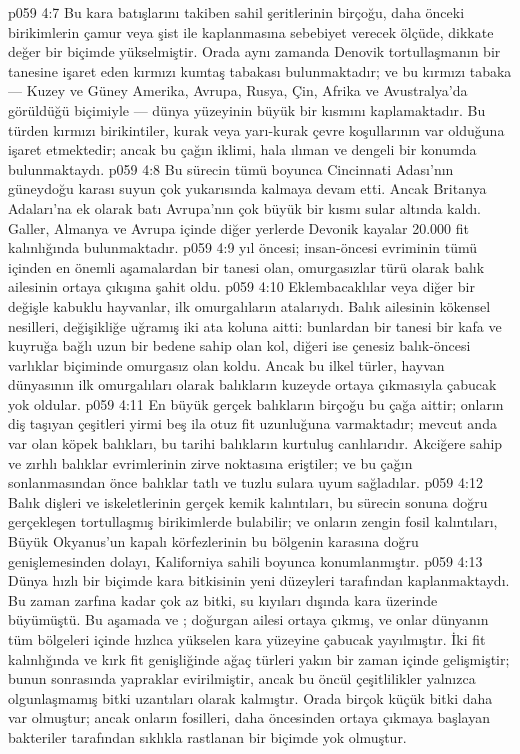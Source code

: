 \vs p059 4:7 Bu kara batışlarını takiben sahil şeritlerinin birçoğu, daha önceki birikimlerin çamur veya şist ile kaplanmasına sebebiyet verecek ölçüde, dikkate değer bir biçimde yükselmiştir. Orada aynı zamanda Denovik tortullaşmanın bir tanesine işaret eden kırmızı kumtaş tabakası bulunmaktadır; ve bu kırmızı tabaka --- Kuzey ve Güney Amerika, Avrupa, Rusya, Çin, Afrika ve Avustralya’da görüldüğü biçimiyle --- dünya yüzeyinin büyük bir kısmını kaplamaktadır. Bu türden kırmızı birikintiler, kurak veya yarı\hyp{}kurak çevre koşullarının var olduğuna işaret etmektedir; ancak bu çağın iklimi, hala ılıman ve dengeli bir konumda bulunmaktaydı.
\vs p059 4:8 Bu sürecin tümü boyunca Cincinnati Adası’nın güneydoğu karası suyun çok yukarısında kalmaya devam etti. Ancak Britanya Adaları’na ek olarak batı Avrupa’nın çok büyük bir kısmı sular altında kaldı. Galler, Almanya ve Avrupa içinde diğer yerlerde Devonik kayalar 20.000 fit kalınlığında bulunmaktadır.
\vs p059 4:9  yıl öncesi; insan\hyp{}öncesi evriminin tümü içinden en önemli aşamalardan bir tanesi olan, omurgasızlar türü olarak balık ailesinin ortaya çıkışına şahit oldu.
\vs p059 4:10 Eklembacaklılar veya diğer bir değişle kabuklu hayvanlar, ilk omurgalıların atalarıydı. Balık ailesinin kökensel nesilleri, değişikliğe uğramış iki ata koluna aitti: bunlardan bir tanesi bir kafa ve kuyruğa bağlı uzun bir bedene sahip olan kol, diğeri ise çenesiz balık\hyp{}öncesi varlıklar biçiminde omurgasız olan koldu. Ancak bu ilkel türler, hayvan dünyasının ilk omurgalıları olarak balıkların kuzeyde  ortaya çıkmasıyla çabucak yok oldular.
\vs p059 4:11 En büyük gerçek balıkların birçoğu bu çağa aittir; onların diş taşıyan çeşitleri yirmi beş ila otuz fit uzunluğuna varmaktadır; mevcut anda var olan köpek balıkları, bu tarihi balıkların kurtuluş canlılarıdır. Akciğere sahip ve zırhlı balıklar evrimlerinin zirve noktasına eriştiler; ve bu çağın sonlanmasından önce balıklar tatlı ve tuzlu sulara uyum sağladılar.
\vs p059 4:12 Balık dişleri ve iskeletlerinin gerçek kemik kalıntıları, bu sürecin sonuna doğru gerçekleşen tortullaşmış birikimlerde bulabilir; ve onların zengin fosil kalıntıları, Büyük Okyanus’un kapalı körfezlerinin bu bölgenin karasına doğru genişlemesinden dolayı, Kaliforniya sahili boyunca konumlanmıştır.
\vs p059 4:13 Dünya hızlı bir biçimde kara bitkisinin yeni düzeyleri tarafından kaplanmaktaydı. Bu zaman zarfına kadar çok az bitki, su kıyıları dışında kara üzerinde büyümüştü. Bu aşamada ve ; doğurgan  ailesi ortaya çıkmış, ve onlar dünyanın tüm bölgeleri içinde hızlıca yükselen kara yüzeyine çabucak yayılmıştır. İki fit kalınlığında ve kırk fit genişliğinde ağaç türleri yakın bir zaman içinde gelişmiştir; bunun sonrasında yapraklar evirilmiştir, ancak bu öncül çeşitlilikler yalnızca olgunlaşmamış bitki uzantıları olarak kalmıştır. Orada birçok küçük bitki daha var olmuştur; ancak onların fosilleri, daha öncesinden ortaya çıkmaya başlayan bakteriler tarafından sıklıkla rastlanan bir biçimde yok olmuştur.
